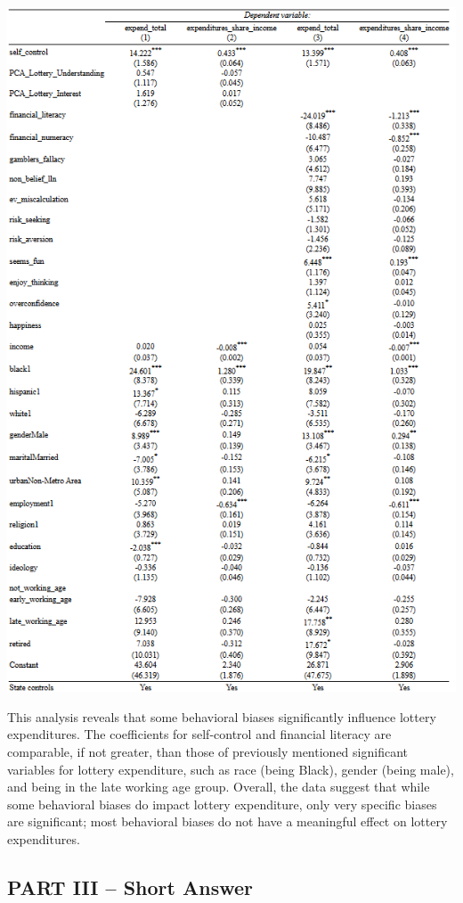\documentclass[
  12pt]{article}
\begin{document}
\includegraphics{images/7-01.png}

This analysis reveals that some behavioral biases significantly
influence lottery expenditures. The coefficients for self-control and
financial literacy are comparable, if not greater, than those of
previously mentioned significant variables for lottery expenditure, such
as race (being Black), gender (being male), and being in the late
working age group. Overall, the data suggest that while some behavioral
biases do impact lottery expenditure, only very specific biases are
significant; most behavioral biases do not have a meaningful effect on
lottery expenditures.

\subsection{PART III -- Short Answer}\label{part-iii-short-answer}
\end{document}
